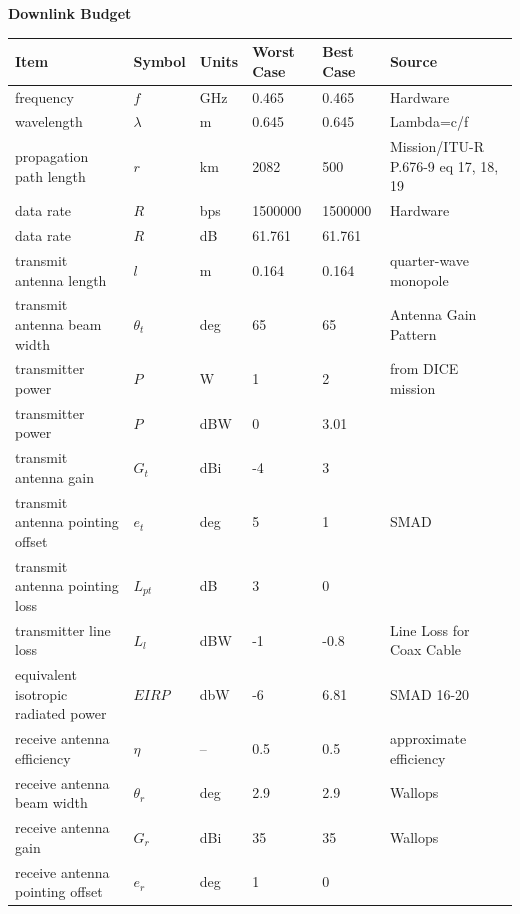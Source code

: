 \documentclass[12pt]{article}
\begin{document}
\textbf{Downlink Budget}
\small
\begin{center}
\begin{longtable}{| p{3.9cm} | p{1.6cm} | p{1.4cm} | p{1.4cm} | p{1.4cm} | p{5cm} |}
\hline
    \textbf{Item}  & \textbf{Symbol} & \textbf{Units}  & \textbf{Worst Case} & \textbf{Best Case} & \textbf{Source}  \\
    \hline \hline
    frequency & $f$     & GHz   & 0.465 & 0.465 & Hardware \\\hline
    wavelength & $\lambda$ & m     & 0.645 & 0.645 & Lambda=c/f \\\hline
    propagation path length & $r$     & km    & 2082  & 500   & Mission/ITU-R P.676-9 eq 17, 18, 19 \\\hline
    data rate & $R$     & bps   & 1500000 & 1500000 & Hardware \\\hline
    data rate & $R$     & dB    & 61.761 & 61.761 &  \\\hline
    transmit antenna length & $l$     & m     & 0.164 & 0.164 & quarter-wave monopole \\\hline
    transmit antenna beam width & $\theta_t$ & deg   & 65    & 65    & Antenna Gain Pattern \\\hline
    transmitter power & $P$     & W     & 1     & 2     & from DICE mission \\\hline
    transmitter power & $P$     & dBW   & 0     & 3.01  &  \\\hline
    transmit antenna gain & $G_t$  & dBi   & -4    & 3     &  \\\hline
    transmit antenna pointing offset & $e_t$  & deg   & 5     & 1     & SMAD \\\hline
    transmit antenna pointing loss & $L_{pt}$ & dB    & 3     & 0     &  \\\hline
    transmitter line loss & $L_l$  & dBW   & -1    & -0.8  & Line Loss for Coax Cable \cite{loss-calc} \\\hline
    equivalent isotropic radiated power & $EIRP$  & dbW   & -6    & 6.81  & SMAD 16-20 \\\hline
    receive antenna efficiency & $\eta$   & --    & 0.5   & 0.5   & approximate efficiency \\\hline
    receive antenna beam width & $\theta_r$ & deg   & 2.9   & 2.9   & Wallops \\\hline
    receive antenna gain & $G_r$  & dBi   & 35    & 35    & Wallops \\\hline
    receive antenna pointing offset & $e_r$  & deg   & 1     & 0     &  \\\hline

\end{longtable}
\end{center}
\end{document}
